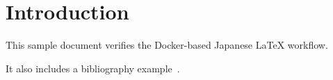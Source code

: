 \chapter{Introduction}

This sample document verifies the Docker-based Japanese LaTeX workflow.

It also includes a bibliography example~\cite{lamport1994latex}.
